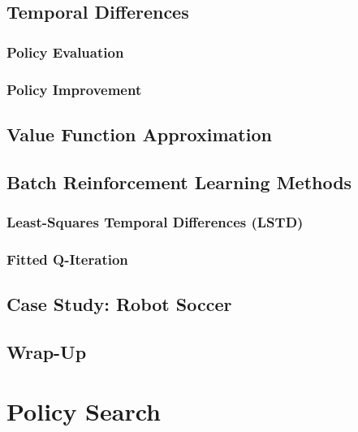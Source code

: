 	\section{Temporal Differences} %

		\subsection{Policy Evaluation} %

		\subsection{Policy Improvement} %

	\section{Value Function Approximation} %

	\section{Batch Reinforcement Learning Methods} %

		\subsection{Least-Squares Temporal Differences (LSTD)} %

		\subsection{Fitted Q-Iteration} %

	\section{Case Study: Robot Soccer} %

	\section{Wrap-Up} %

\chapter{Policy Search} %

